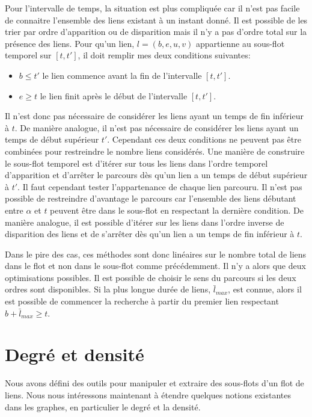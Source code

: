 Pour l'intervalle de temps, la situation est plus compliquée car il n'est pas facile de connaitre l'ensemble des liens existant à un instant donné.
Il est possible de les trier par ordre d'apparition ou de disparition mais il n'y a pas d'ordre total sur la présence des liens.
Pour qu'un lien, $l= (b,e,u,v)$ appartienne au sous-flot temporel sur $[t,t']$, il doit remplir mes deux conditions suivantes:
\begin{itemize}
\item \textbf{$b \leq t'$} le lien commence avant la fin de l'intervalle $[t,t']$.
\item \textbf{$e \geq t$} le lien finit après le début de l'intervalle $[t,t']$.
\end{itemize}


Il n'est donc pas nécessaire de considérer les liens ayant un temps de fin inférieur à $t$.
De manière analogue, il n'est pas nécessaire de considérer les liens ayant un temps de début supérieur $t'$.
Cependant ces deux conditions ne peuvent pas être combinées pour restreindre le nombre liens considérés.
Une manière de construire le sous-flot temporel est d'itérer sur tous les liens dans l'ordre temporel d'apparition et d'arrêter le parcours dès qu'un lien a un temps de début supérieur à $t'$.
Il faut cependant tester l'appartenance de chaque lien parcouru.
Il n'est pas possible de restreindre d'avantage le parcours car l'ensemble des liens débutant entre $\alpha$ et $t$ peuvent être dans le sous-flot en respectant la dernière condition.
De manière analogue, il est possible d'itérer sur les liens dans l'ordre inverse de disparition des liens et de s'arrêter dès qu'un lien a un temps de fin inférieur à $t$.


Dans le pire des cas, ces méthodes sont donc linéaires sur le nombre total de liens dans le flot et non dans le sous-flot comme précédemment.
Il n'y a alors que deux optimisations possibles.
Il est possible de choisir le sens du parcours si les deux ordres sont disponibles.
Si la plus longue durée de liens, $\bar{l}_{max}$, est connue, alors il est possible de commencer la recherche à partir du premier lien respectant $b+\bar{l}_{max} \geq t$.



\section{Degré et densité}
\label{sec:def_densite}
Nous avons défini des outils pour manipuler et extraire des sous-flots d'un flot de liens.
Nous nous intéressons maintenant à étendre quelques notions existantes dans les graphes, en particulier le degré et la densité.


